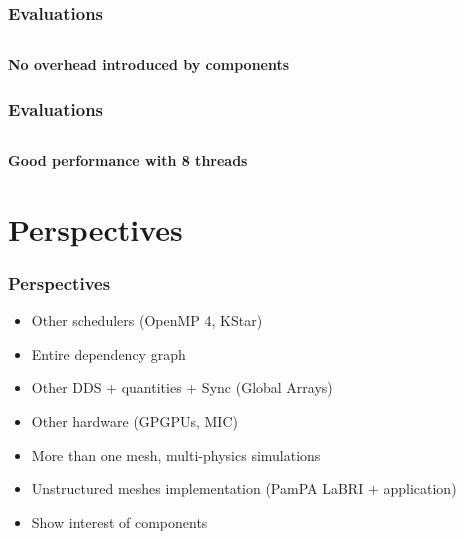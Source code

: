 \documentclass{beamer}
\begin{document}
\begin{frame}
\frametitle{Evaluations}
\begin{columns}
\begin{column}{6cm}
\end{column}
\begin{column}{6cm}
\end{column}
\end{columns}
\begin{center}
\textbf{No overhead introduced by components}
\end{center}
\end{frame}
\begin{frame}
\frametitle{Evaluations}
\begin{columns}
\begin{column}{6cm}
\end{column}
\begin{column}{6cm}
\end{column}
\end{columns}
\begin{center}
\textbf{Good performance with 8 threads}
\end{center}
\end{frame}

\section{Perspectives}
\begin{frame}
\frametitle{Perspectives}
\begin{itemize}
\item Other schedulers (OpenMP 4, KStar)
\item Entire dependency graph
\item Other DDS + quantities + Sync (Global Arrays)
\item Other hardware (GPGPUs, MIC)
\item More than one mesh, multi-physics simulations
\item Unstructured meshes implementation (PamPA LaBRI + application)
\item Show interest of components
\end{itemize}
\end{frame}
\end{document}
